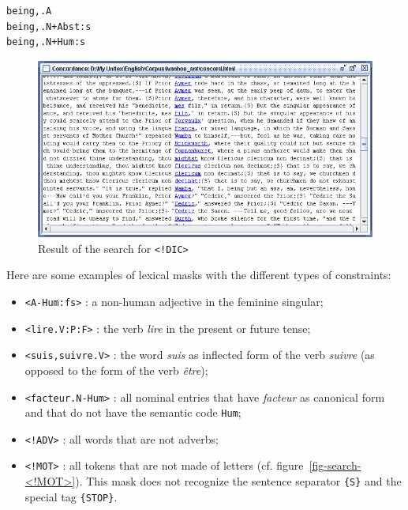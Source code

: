 \begin{verbatim}
being,.A
being,.N+Abst:s
being,.N+Hum:s
\end{verbatim}

\bigskip
\begin{figure}[h]
\begin{center}
\includegraphics[width=15cm]{resources/img/fig4-1.png}
\caption{Result of the search for \texttt{<!DIC>}}
\end{center}
\end{figure}

\bigskip
\noindent Here are some examples of lexical masks with the different types of constraints:

\begin{itemize}
  \item \verb$<A-Hum:fs>$ : a non-human adjective in the feminine singular;
  \item \verb+<lire.V:P:F>+ : the verb \textit{lire} in the present or future
  tense;
  \item \verb$<suis,suivre.V>$ : the word \textit{suis} as inflected form of the
  verb \textit{suivre} (as opposed to the form of the verb \textit{\^etre});
  \item \verb$<facteur.N-Hum>$ : all nominal entries that have \textit{facteur} as
  canonical form and that do not have the semantic code \verb+Hum+;
  \item \verb$<!ADV>$ : all words that are not adverbs;
  \item \verb$<!MOT>$ : all tokens that are not made of letters (cf.
  figure~\ref{fig-search-<!MOT>}). This mask does not recognize the sentence
  separator \verb+{S}+ and the special tag \verb+{STOP}+.
\end{itemize}

